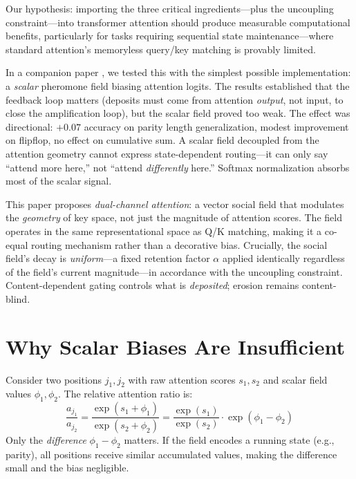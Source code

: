 \documentclass[11pt,a4paper]{article}
\newcommand{\retain}{\alpha}
\begin{document}
Our hypothesis: importing the three critical ingredients---plus the
uncoupling constraint---into transformer attention should produce
measurable computational benefits, particularly for tasks requiring
sequential state maintenance---where standard attention's memoryless
query/key matching is provably limited.

In a companion paper \cite{stigmergic2024}, we tested this with the
simplest possible implementation: a \emph{scalar} pheromone field
biasing attention logits.  The results established that the feedback
loop matters (deposits must come from attention \emph{output}, not
input, to close the amplification loop), but the scalar field proved
too weak.  The effect was directional: $+0.07$ accuracy on parity
length generalization, modest improvement on flipflop, no effect on
cumulative sum.  A scalar field decoupled from the attention geometry
cannot express state-dependent routing---it can only say ``attend more
here,'' not ``attend \emph{differently} here.''  Softmax
normalization absorbs most of the scalar signal.

This paper proposes \emph{dual-channel attention}: a vector social
field that modulates the \emph{geometry} of key space, not just the
magnitude of attention scores.  The field operates in the same
representational space as Q/K matching, making it a co-equal routing
mechanism rather than a decorative bias.  Crucially, the social
field's decay is \emph{uniform}---a fixed retention factor $\retain$
applied identically regardless of the field's current magnitude---in
accordance with the uncoupling constraint.  Content-dependent gating
controls what is \emph{deposited}; erosion remains content-blind.


\section{Why Scalar Biases Are Insufficient}
\label{sec:motivation}

Consider two positions $j_1, j_2$ with raw attention scores $s_1,
s_2$ and scalar field values $\phi_1, \phi_2$.  The relative
attention ratio is:
\begin{equation}
    \frac{a_{j_1}}{a_{j_2}}
    = \frac{\exp(s_1 + \phi_1)}{\exp(s_2 + \phi_2)}
    = \frac{\exp(s_1)}{\exp(s_2)} \cdot \exp(\phi_1 - \phi_2)
\end{equation}
Only the \emph{difference} $\phi_1 - \phi_2$ matters.  If the field
encodes a running state (e.g., parity), all positions receive similar
accumulated values, making the difference small and the bias
negligible.
\end{document}
